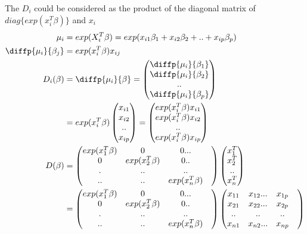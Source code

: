 The $D_i$ could be considered as the product of the diagonal matrix of $diag\{exp( x_i^T \beta) \}$ and $x_i$
\begin{align*}
	\mu_i &= exp(X_i^T \beta) = exp(x_{i1} \beta_1 + x_{i2} \beta_2 + .. + x_{ip} \beta_p)\\
	\diffp{\mu_i}{{\beta_j}} &= exp( x_i^T \beta) x_{ij} \\
	D_i(\beta) &= \diffp{\mu_i}{{\beta}} = \begin{pmatrix}
		\diffp{\mu_i}{{\beta_1}}  \\
		\diffp{\mu_i}{{\beta_2}} \\
		..  \\
		\diffp{\mu_i}{{\beta_p}} 
	\end{pmatrix} \\
 &= exp(x_i^T \beta) \begin{pmatrix}
x_{i1}  \\
x_{i2}\\
..  \\
x_{ip}\\
\end{pmatrix} = \begin{pmatrix}
exp(x_i^T \beta) x_{i1}  \\
exp(x_i^T \beta) x_{i2}\\
..  \\
exp(x_i^T \beta) x_{ip}\\
\end{pmatrix}\\
D(\beta) &= \begin{pmatrix}
	exp(x_1^T \beta) & 0  & 0...& \\
	0 & exp(x_2^T \beta) & 0 ..& \\
	.&..&..&  \\
	..& ..&  exp(x_n^T \beta)
\end{pmatrix} \begin{pmatrix}
	x_{1}^T  \\
	x_{2}^T \\
	..  \\
	x_{n}^T\\
\end{pmatrix}\\
 &= \begin{pmatrix}
exp(x_1^T \beta) & 0  & 0...& \\
0 & exp(x_2^T \beta) & 0 ..& \\
.&..&..&  \\
..& ..&  exp(x_n^T \beta)
\end{pmatrix} \begin{pmatrix}
x_{11} & x_{12} ... & x_{1p}  \\
x_{21} & x_{22} ... & x_{2p}  \\
.. &.. & ..&  \\
x_{n1} & x_{n2} ... & x_{np} \\
\end{pmatrix} 
\end{align*} 
